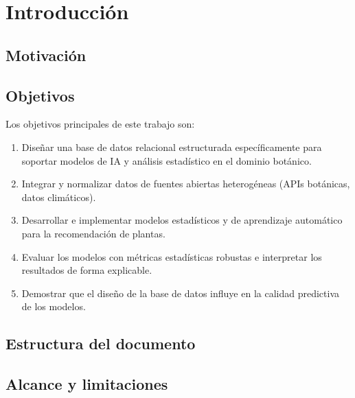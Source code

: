 \documentclass[12pt, a4paper]{article}
\begin{document}
\tableofcontents
\newpage
\listoffigures
\listoftables
\newpage

\section{Introducción}
\label{sec:intro}

\subsection{Motivación}

\subsection{Objetivos}
Los objetivos principales de este trabajo son:

\begin{enumerate}
  \item Diseñar una base de datos relacional estructurada específicamente para
        soportar modelos de IA y análisis estadístico en el dominio botánico.
  \item Integrar y normalizar datos de fuentes abiertas heterogéneas (APIs
        botánicas, datos climáticos).
  \item Desarrollar e implementar modelos estadísticos y de aprendizaje
        automático para la recomendación de plantas.
  \item Evaluar los modelos con métricas estadísticas robustas e interpretar
        los resultados de forma explicable.
  \item Demostrar que el diseño de la base de datos influye en la calidad
        predictiva de los modelos.
\end{enumerate}

\subsection{Estructura del documento}

\subsection{Alcance y limitaciones}
\end{document}
